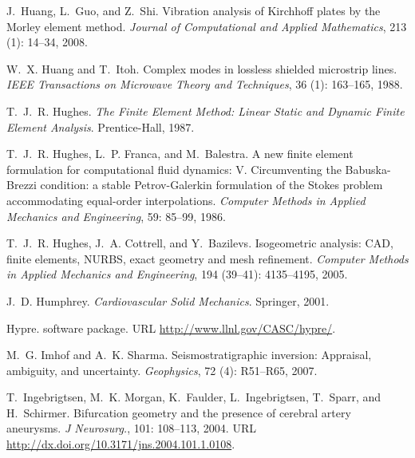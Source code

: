 \begin{thebibliography}{467}
J.~Huang, L.~Guo, and Z.~Shi.
\newblock Vibration analysis of {K}irchhoff plates by the {M}orley element
  method.
\newblock \emph{Journal of Computational and Applied Mathematics}, 213
  (1): 14--34, 2008.

W.~X. Huang and T.~Itoh.
\newblock Complex modes in lossless shielded microstrip lines.
\newblock \emph{IEEE Transactions on Microwave Theory and Techniques},
  36 (1): 163--165, 1988.

T.~J.~R. Hughes.
\newblock \emph{The Finite Element Method: Linear Static and Dynamic Finite
  Element Analysis}.
\newblock Prentice-Hall, 1987.

T.~J.~R. Hughes, L.~P. Franca, and M.~Balestra.
\newblock A new finite element formulation for computational fluid dynamics:
  {V}. {C}ircumventing the {B}abuska-{B}rezzi condition: a stable
  {P}etrov-{G}alerkin formulation of the {S}tokes problem accommodating
  equal-order interpolations.
\newblock \emph{Computer Methods in Applied Mechanics and Engineering},
  59: 85--99, 1986.

T.~J.~R. Hughes, J.~A. Cottrell, and Y.~Bazilevs.
\newblock Isogeometric analysis: {CAD}, finite elements, {NURBS}, exact
  geometry and mesh refinement.
\newblock \emph{Computer Methods in Applied Mechanics and Engineering},
  194 (39--41): 4135--4195, 2005.

J.~D. Humphrey.
\newblock \emph{Cardiovascular Solid Mechanics}.
\newblock Springer, 2001.

Hypre.
\newblock software package.
\newblock URL \url{http://www.llnl.gov/CASC/hypre/}.

M.~G. Imhof and A.~K. Sharma.
\newblock Seismostratigraphic inversion: Appraisal, ambiguity, and uncertainty.
\newblock \emph{Geophysics}, 72 (4): R51--R65, 2007.

T.~Ingebrigtsen, M.~K. Morgan, K.~Faulder, L.~Ingebrigtsen, T.~Sparr, and
  H.~Schirmer.
\newblock Bifurcation geometry and the presence of cerebral artery aneurysms.
\newblock \emph{J Neurosurg.}, 101: 108--113, 2004.
\newblock URL \url{http://dx.doi.org/10.3171/jns.2004.101.1.0108}.


\end{thebibliography}
